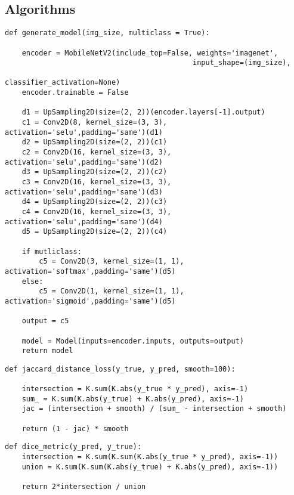 \subsection{Algorithms}
\begin{lstlisting}[caption={Simplified Decoder}, captionpos=b, label={lst:simpleDecoder}]
def generate_model(img_size, multiclass = True):
    
    encoder = MobileNetV2(include_top=False, weights='imagenet',
                                            input_shape=(img_size),
                                            classifier_activation=None)
    encoder.trainable = False

    d1 = UpSampling2D(size=(2, 2))(encoder.layers[-1].output)
    c1 = Conv2D(8, kernel_size=(3, 3), activation='selu',padding='same')(d1)
    d2 = UpSampling2D(size=(2, 2))(c1)
    c2 = Conv2D(16, kernel_size=(3, 3), activation='selu',padding='same')(d2)
    d3 = UpSampling2D(size=(2, 2))(c2)
    c3 = Conv2D(16, kernel_size=(3, 3), activation='selu',padding='same')(d3)
    d4 = UpSampling2D(size=(2, 2))(c3)
    c4 = Conv2D(16, kernel_size=(3, 3), activation='selu',padding='same')(d4)
    d5 = UpSampling2D(size=(2, 2))(c4)
    
    if mutliclass:
        c5 = Conv2D(3, kernel_size=(1, 1), activation='softmax',padding='same')(d5)
    else:
        c5 = Conv2D(1, kernel_size=(1, 1), activation='sigmoid',padding='same')(d5)
    
    output = c5

    model = Model(inputs=encoder.inputs, outputs=output)
    return model
\end{lstlisting}
\begin{lstlisting}[caption={Jaccard Distance },label={lst:jaccard},captionpos=b]
def jaccard_distance_loss(y_true, y_pred, smooth=100):

    intersection = K.sum(K.abs(y_true * y_pred), axis=-1)
    sum_ = K.sum(K.abs(y_true) + K.abs(y_pred), axis=-1)
    jac = (intersection + smooth) / (sum_ - intersection + smooth)
    
    return (1 - jac) * smooth
\end{lstlisting}
\begin{lstlisting}[caption={Dice Metric},label={lst:dice_metric},captionpos=b]
def dice_metric(y_pred, y_true):
    intersection = K.sum(K.sum(K.abs(y_true * y_pred), axis=-1))
    union = K.sum(K.sum(K.abs(y_true) + K.abs(y_pred), axis=-1))

    return 2*intersection / union
\end{lstlisting}

